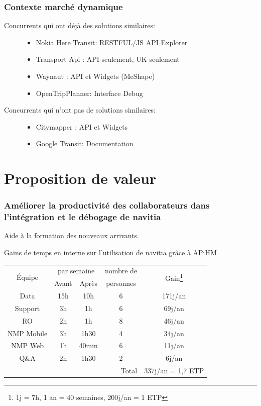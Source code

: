 \documentclass[table]{beamer}
\begin{document}
\begin{frame}
  \frametitle{Contexte marché dynamique}
  \begin{description}
  \item[Concurrents qui ont déjà des solutions similaires: ]\strut\par
    \begin{itemize}
    \item Nokia Here Transit: RESTFUL/JS API Explorer
    \item Transport Api : API seulement, UK seulement
    \item Waynaut :  API et Widgets (MeShape)
    \item OpenTripPlanner: Interface Debug
    \end{itemize}
  \item[Concurrents qui n'ont pas de solutions similaires: ]\strut\par
    \begin{itemize}
    \item Citymapper : API et Widgets 
    \item Google Transit: Documentation
    \end{itemize}
  \end{description}
\end{frame}

\section{Proposition de valeur}

\begin{frame}
  \frametitle{Améliorer la productivité des collaborateurs dans
    l'intégration et le débogage de navitia}

  Aide à la formation des nouveaux arrivants.

  Gains de temps en interne sur l'utilisation de navitia
  grâce à APiHM
  \vfill
  \centering
  \begin{tabular}{|c|c|c|c|c|}
    \hline
    \multirow{2}{*}{Équipe}& \multicolumn{2}{c|}{par
      semaine}&nombre de&\multirow{2}{*}{Gain\footnote{1j = 7h,
        1 an = 40 semaines, 200j/an = 1 ETP}}\\
    \hhline{~--~~}
    & Avant & Après & personnes &\\
    \hline
    Data       &15h &10h & 6 & 171j/an\\
    Support    & 3h & 1h & 6 &  69j/an\\
    RO         & 2h & 1h & 8 &  46j/an\\
    NMP Mobile & 3h &1h30& 4 &  34j/an\\
    NMP Web    & 1h &40min&6 &  11j/an\\
    Q\&A       & 2h &1h30& 2 &   6j/an\\
    \hline
    \multicolumn{4}{|r|}{Total} &
    337j/an = 1{,}7 ETP\\
    \hline
  \end{tabular}
\end{frame}
\end{document}
